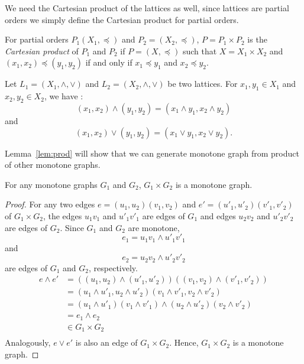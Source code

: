 We need the Cartesian product of the lattices as well,
since lattices are partial orders we simply define the Cartesian product
for partial orders.
\begin{defi} 
For partial orders \(P_1(X_1,\preceq)\) and \(P_2=(X_2,\preceq)\), 
\(P= P_1 \times P_2\) is the \emph{Cartesian product} of \(P_1\) and \(P_2\)
if \(P=(X,\preceq)\) such that \(X=X_1\times X_2\) and \((x_1,x_2) \preceq (y_1,y_2)\)
if and only if \(x_1\preceq y_1\) and \(x_2\preceq y_2\)\@.
\end{defi}

\begin{rem}
Let \(L_1=(X_1,\wedge,\vee)\) and \(L_2=(X_2,\wedge,\vee)\) be two lattices.
For \(x_1,y_1 \in X_1\) and \(x_2,y_2\in X_2\), we have :
\[(x_1,x_2)\wedge (y_1,y_2) = (x_1\wedge y_1, x_2 \wedge y_2) \]
and \[(x_1,x_2)\vee (y_1,y_2) = (x_1\vee y_1, x_2 \vee y_2).\]
\end{rem}

Lemma~\ref{lem:prod} will show that we can generate monotone graph from product of other
monotone graphs.

\begin{lemma}\label{lem:prod}
For any monotone graphs \(G_1\) and \(G_2\), \(G_1 \times G_2\) is a monotone graph.
\end{lemma}

\begin{proof}
For any two edges \(e = (u_1,u_2)(v_1,v_2)\) and \(e' =(u'_1,u'_2)(v'_1,v'_2)\) of \(G_1\times G_2\),
the edges \(u_1v_1\) and \(u'_1v'_1\) are edges of \(G_1\) and
edges \(u_2v_2\) and \(u'_2v'_2\) are edges of \(G_2\)\@.
Since \(G_1\) and \(G_2\) are monotone,
\[e_1 = u_1v_1 \wedge u'_1v'_1\]
and
\[e_2 = u_2v_2 \wedge u'_2v'_2\]
are edges of \(G_1\) and \(G_2\), respectively.
\begin{align*}
e \wedge e' &= ((u_1,u_2)\wedge(u'_1,u'_2))((v_1,v_2)\wedge(v'_1,v'_2)) \\
&= (u_1\wedge u'_1,u_2 \wedge u'_2)(v_1\wedge v'_1,v_2 \wedge v'_2) \\
&= (u_1\wedge u'_1)(v_1\wedge v'_1) \wedge (u_2\wedge u'_2)(v_2\wedge v'_2) \\
&= e_1 \wedge e_2 \\
&\in G_1 \times G_2 \\
\end{align*}
Analogously, \(e \vee e'\) is also an edge of \(G_1\times G_2\)\@. Hence, \(G_1\times G_2\)
is a monotone graph.
\end{proof}

